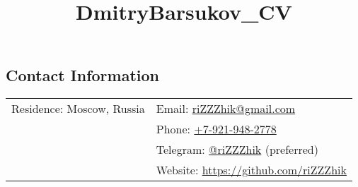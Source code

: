 \documentclass[margin,line]{res}
\begin{document}
\title{DmitryBarsukov_CV}

\begin{resume}

\section{\sc Contact Information}

\vspace{.05in}
\begin{tabular}{@{}p{2.30in}p{3in}}
Residence: Moscow, Russia
& Email: \href{mailto:riZZZhik@gmail.com}{riZZZhik@gmail.com} \\
& Phone: \href{tel:+79219482778}{+7-921-948-2778} \\
& Telegram: \href{https://t.me/riZZZhik}{@riZZZhik} (preferred) \\
& Website: \href{https://github.com/riZZZhik}{https://github.com/riZZZhik} \\
\end{tabular}





\end{resume}
\end{document}
